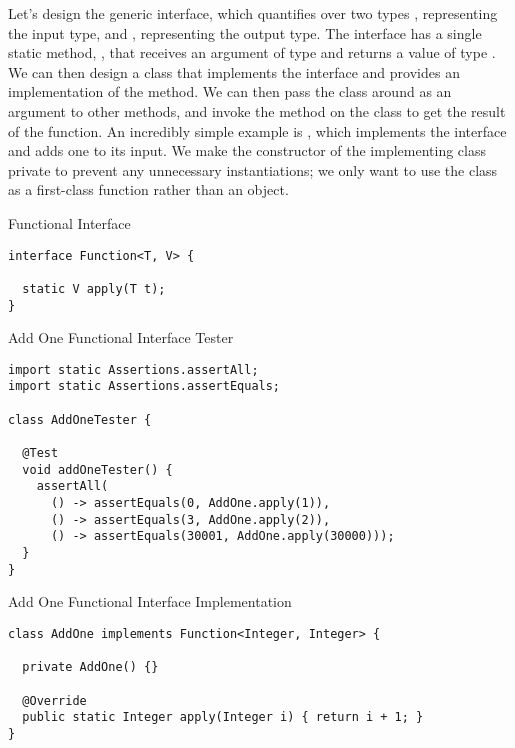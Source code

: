 
Let's design the generic  interface, which quantifies over two types , representing the input type, and , representing the output type. The  interface has a single static method, , that receives an argument of type  and returns a value of type . We can then design a class that implements the  interface and provides an implementation of the  method. We can then pass the class around as an argument to other methods, and invoke the  method on the class to get the result of the function. An incredibly simple example is , which implements the  interface and adds one to its input. We make the constructor of the implementing class private to prevent any unnecessary instantiations; we only want to use the class as a first-class function rather than an object.

\begin{cl}{Functional Interface}
\begin{lstlisting}[language=MyJava]
interface Function<T, V> {

  static V apply(T t); 
}
\end{lstlisting}
\end{cl}

\begin{cl}{Add One Functional Interface Tester}
\begin{lstlisting}[language=MyJava]
import static Assertions.assertAll;
import static Assertions.assertEquals;

class AddOneTester {

  @Test
  void addOneTester() {
    assertAll(
      () -> assertEquals(0, AddOne.apply(1)),
      () -> assertEquals(3, AddOne.apply(2)),
      () -> assertEquals(30001, AddOne.apply(30000)));
  }
}
\end{lstlisting}
\end{cl}
\begin{cl}{Add One Functional Interface Implementation}
\begin{lstlisting}[language=MyJava]
class AddOne implements Function<Integer, Integer> {

  private AddOne() {}

  @Override
  public static Integer apply(Integer i) { return i + 1; }
}
\end{lstlisting}
\end{cl}

